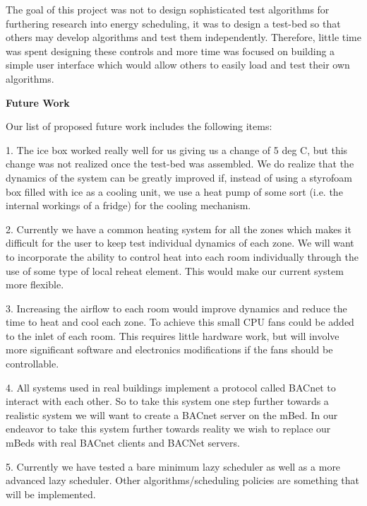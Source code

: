 \documentclass[a4paper,10pt,twocolumn]{article}
\begin{document}
The goal of this project was not to design sophisticated test algorithms for furthering research into energy scheduling, it was to design a test-bed so that others may develop algorithms and test them independently.  Therefore, little time was spent designing these controls and more time was focused on building a simple user interface which would allow others to easily load and test their own algorithms.

\begin{center}
{\bf Future Work}
\end{center}

Our list of proposed future work includes the following items:

1.  The ice box worked really well for us giving us a change of 5 deg C, but this change was not realized once the test-bed was assembled. We do realize that the dynamics of the system can be greatly improved if, instead of using a styrofoam box filled with ice as a cooling unit, we use a heat pump of some sort (i.e. the internal workings of a fridge) for the cooling mechanism.  

2.  Currently we have a common heating system for all the zones which makes it difficult for the user to keep test individual dynamics of each zone. We will want to incorporate the ability to control heat into each room individually through the use of some type of local reheat element. This would make our current system more flexible.

3.  Increasing the airflow to each room would improve dynamics and reduce the time to heat and cool each zone.  To achieve this small CPU fans could be added to the inlet of each room.  This requires little hardware work, but will involve more significant software and electronics modifications if the fans should be controllable.

4.  All systems used in real buildings implement a protocol called BACnet to interact with each other. So to take this system one step further towards a realistic system we will want to create a BACnet server on the mBed. In our endeavor to take this system further towards reality we wish to replace our mBeds with real BACnet clients and BACNet servers.

5.  Currently we have tested a bare minimum lazy scheduler as well as a more advanced lazy scheduler. Other algorithms/scheduling policies are something that will be implemented.

\vspace{5mm}
\end{document}
